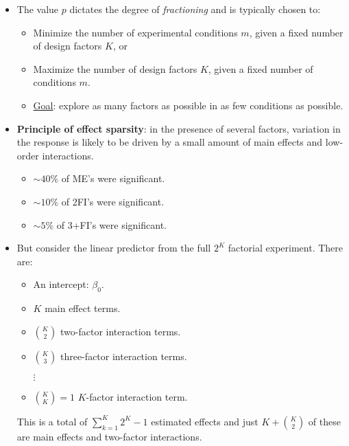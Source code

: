 \begin{itemize}
    \item The value $ p $ dictates the degree of \emph{fractioning} and is typically chosen to:
          \begin{itemize}[$\rightarrow$]
              \item Minimize the number of experimental conditions $ m $, given a fixed number of design factors $ K $, or
              \item Maximize the number of design factors $ K $, given a fixed number of conditions $ m $.
          \end{itemize}
          \begin{itemize}[*]
              \item \underline{Goal}: explore as many factors as possible in as few conditions as possible.
          \end{itemize}
    \item \textbf{Principle of effect sparsity}: in the presence of several factors, variation in the response is likely to
          be driven by a small amount of main effects and low-order interactions.
          \begin{itemize}[$\rightarrow$]
              \item $ \sim 40\% $ of ME's were significant.
              \item $ \sim 10\% $ of 2FI's were significant.
              \item $ \sim 5\% $ of 3+FI's were significant.
          \end{itemize}
    \item But consider the linear predictor from the full $ 2^K $ factorial experiment. There are:
          \begin{itemize}
              \item An intercept: $ \beta_0 $.
              \item $ K $ main effect terms.
              \item $ \binom{K}{2} $ two-factor interaction terms.
              \item $ \binom{K}{3} $ three-factor interaction terms.
              \item[$\vdots$]
              \item $ \binom{K}{K}=1 $ $ K $-factor interaction term.
          \end{itemize}
          This is a total of $ \sum_{k=1}^{K} 2^K-1 $ estimated effects and just $ K+\binom{K}{2} $ of these are main effects
          and two-factor interactions.

\end{itemize}
